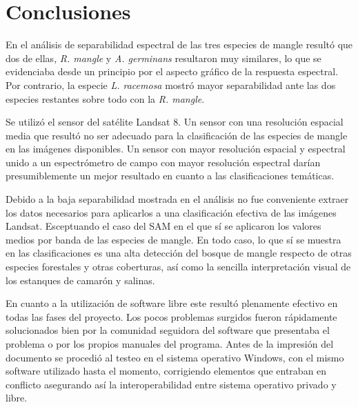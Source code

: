 


\chapter{Conclusiones}

En el análisis de separabilidad espectral de las tres especies de mangle resultó que dos de ellas, \textit{R. mangle} y \textit{A. germinans} resultaron muy similares, lo que se evidenciaba desde un principio por el aspecto gráfico de la respuesta espectral. Por contrario, la especie \textit{L. racemosa} mostró mayor separabilidad ante las dos especies restantes sobre todo con la \textit{R. mangle}.

Se utilizó el sensor del satélite Landsat 8. Un sensor con una resolución espacial media que resultó no ser adecuado para la clasificación de las especies de mangle en las imágenes disponibles. Un sensor con mayor resolución espacial y espectral unido a un espectrómetro de campo con mayor resolución espectral darían presumiblemente un mejor resultado en cuanto a las clasificaciones temáticas.

Debido a la baja separabilidad mostrada en el análisis no fue conveniente extraer los datos necesarios para aplicarlos a una clasificación efectiva de las imágenes Landsat. Esceptuando el caso del \ac{SAM} en el que sí se aplicaron los valores medios por banda de las especies de mangle. En todo caso, lo que sí se muestra en las clasificaciones es una alta detección del bosque de mangle respecto de otras especies forestales y otras coberturas, así como la sencilla interpretación visual de los estanques de camarón y salinas.

En cuanto a la utilización de software libre este resultó plenamente efectivo en todas las fases del proyecto. Los pocos problemas surgidos fueron rápidamente solucionados bien por la comunidad seguidora del software que presentaba el problema o por los propios manuales del programa. Antes de la impresión del documento se procedió al testeo en el sistema operativo Windows, con el mismo software utilizado hasta el momento, corrigiendo elementos que entraban en conflicto asegurando así la interoperabilidad entre sistema operativo privado y libre.